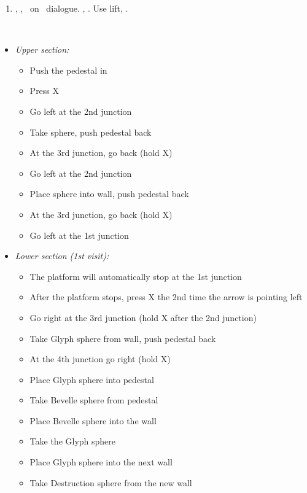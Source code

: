 \begin{enumerate}[resume]
    \item \sd, \skippablefmv[1:30], \sd\ on \yuna\ dialogue. \skippablefmv[30], \sd. Use lift, \sd.
\end{enumerate}
\bothvfill
\winvfill
\lossvfill
\ 
\begin{trial}
    \begin{itemize}
        \item \textit{Upper section:}
        \begin{itemize}
            \item Push the pedestal in
            \item Press X
            \item Go left at the 2nd junction
            \item Take sphere, push pedestal back
            \item At the 3rd junction, go back (hold X)
            \item Go left at the 2nd junction
            \item Place sphere into wall, push pedestal back
            \item At the 3rd junction, go back (hold X)
            \item Go left at the 1st junction
        \end{itemize}
        \item \textit{Lower section (1st visit):}
        \begin{itemize}
            \item The platform will automatically stop at the 1st junction
            \item After the platform stops, press X the 2nd time the arrow is pointing left
            \item Go right at the 3rd junction (hold X after the 2nd junction)
            \item Take Glyph sphere from wall, push pedestal back
            \item At the 4th junction go right (hold X)
            \item Place Glyph sphere into pedestal
            \item Take Bevelle sphere from pedestal
            \item Place Bevelle sphere into the wall
            \item Take the Glyph sphere
            \item Place Glyph sphere into the next wall
            \item Take Destruction sphere from the new wall

\end{itemize}
\end{itemize}
\end{trial}
